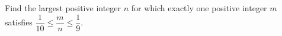 Find the largest positive integer $n$ for which exactly one positive integer $m$ satisfies $\dfrac{1}{10}\le \dfrac{m}{n}\le\dfrac{1}{9}$.
